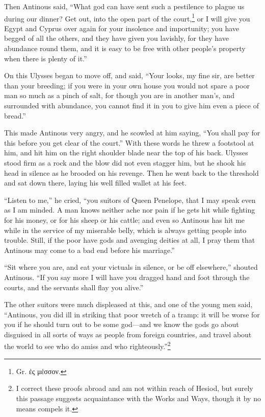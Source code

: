Then Antinous said, “What god can have sent such a pestilence to plague us
during our dinner? Get out, into the open part of the court,\footnote{Gr. ἐς μέσσον.} or I will give
you Egypt and Cyprus over again for your insolence and importunity; you have
begged of all the others, and they have given you lavishly, for they have
abundance round them, and it is easy to be free with other people’s property
when there is plenty of it.”

On this Ulysses began to move off, and said, “Your looks, my fine sir, are
better than your breeding; if you were in your own house you would not spare a
poor man so much as a pinch of salt, for though you are in another man’s, and
surrounded with abundance, you cannot find it in you to give him even a piece
of bread.”

This made Antinous very angry, and he scowled at him saying, “You shall pay for
this before you get clear of the court.” With these words he threw a footstool
at him, and hit him on the right shoulder blade near the top of his back.
Ulysses stood firm as a rock and the blow did not even stagger him, but he
shook his head in silence as he brooded on his revenge. Then he went back to
the threshold and sat down there, laying his well filled wallet at his feet.

“Listen to me,” he cried, “you suitors of Queen Penelope, that I may speak even
as I am minded. A man knows neither ache nor pain if he gets hit while fighting
for his money, or for his sheep or his cattle; and even so Antinous has hit me
while in the service of my miserable belly, which is always getting people into
trouble. Still, if the poor have gods and avenging deities at all, I pray them
that Antinous may come to a bad end before his marriage.”

“Sit where you are, and eat your victuals in silence, or be off elsewhere,”
shouted Antinous. “If you say more I will have you dragged hand and foot
through the courts, and the servants shall flay you alive.”

The other suitors were much displeased at this, and one of the young men said,
“Antinous, you did ill in striking that poor wretch of a tramp: it will be
worse for you if he should turn out to be some god—and we know the gods go
about disguised in all sorts of ways as people from foreign countries, and
travel about the world to see who do amiss and who righteously.”\footnote{I correct these proofs abroad and am not within reach of Hesiod, but surely
this passage suggests acquaintance with the Works and Ways, though it by no
means compels it.}

